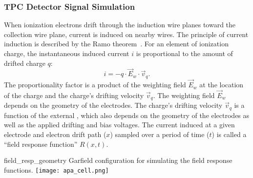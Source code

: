 \subsubsection{TPC Detector Signal Simulation}\label{sec:tpc_sim}

When ionization electrons drift through the induction wire planes toward the collection wire plane, current is
induced on nearby wires. The principle of current induction is described by the Ramo theorem~\cite{Shockley1938,Ramo:1939vr}. 
For an element of ionization charge, the instantaneous induced current $i$ is proportional to the amount of drifted charge $q$: 
\begin{equation}\label{eq:shockley_ramo}
  i = - q \cdot \vec{E}_w \cdot \vec{v}_q.
\end{equation}
The proportionality factor is a product of the weighting field $\vec{E}_w$ at the location of the charge and 
the charge's drifting velocity $\vec{v}_q$. The weighting field $\vec{E}_w$ depends on the geometry of 
the electrodes. The charge's drifting velocity $\vec{v}_q$ is a function of the external \efield, which 
also depends on the geometry of the electrodes as well as the applied drifting and bias voltages. The current induced at a given electrode and electron drift path ($x$)
  sampled over a period of time ($t$) is called a ``field response function'' $R(x,t)$.
\begin{dunefigure}
{field_resp_geometry}
{Garfield configuration for simulating the field response functions.}
\texttt{[image: apa\_cell.png]}
\end{dunefigure}


